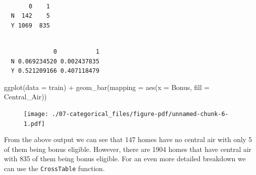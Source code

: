 \documentclass[
  letterpaper,
  DIV=11,
  numbers=noendperiod]{scrreprt}
\newenvironment{Shaded}{\begin{snugshade}}{\end{snugshade}}
\newcommand{\AttributeTok}[1]{\textcolor[rgb]{0.40,0.45,0.13}{#1}}
\newcommand{\FunctionTok}[1]{\textcolor[rgb]{0.28,0.35,0.67}{#1}}
\newcommand{\NormalTok}[1]{\textcolor[rgb]{0.00,0.23,0.31}{#1}}
\newcommand{\SpecialCharTok}[1]{\textcolor[rgb]{0.37,0.37,0.37}{#1}}
\begin{document}
\begin{verbatim}
   
       0    1
  N  142    5
  Y 1069  835
\end{verbatim}

\begin{Shaded}
\end{Shaded}

\begin{verbatim}
   
              0           1
  N 0.069234520 0.002437835
  Y 0.521209166 0.407118479
\end{verbatim}

\begin{Shaded}
\begin{Highlighting}[]
\FunctionTok{ggplot}\NormalTok{(}\AttributeTok{data =}\NormalTok{ train) }\SpecialCharTok{+}
  \FunctionTok{geom\_bar}\NormalTok{(}\AttributeTok{mapping =} \FunctionTok{aes}\NormalTok{(}\AttributeTok{x =}\NormalTok{ Bonus, }\AttributeTok{fill =}\NormalTok{ Central\_Air))}
\end{Highlighting}
\end{Shaded}

\begin{figure}[H]

{\centering \texttt{[image: ./07-categorical\_files/figure-pdf/unnamed-chunk-6-1.pdf]}

}

\end{figure}

From the above output we can see that 147 homes have no central air with
only 5 of them being bonus eligible. However, there are 1904 homes that
have central air with 835 of them being bonus eligible. For an even more
detailed breakdown we can use the \texttt{CrossTable} function.

\begin{Shaded}
\end{Shaded}
\end{document}
